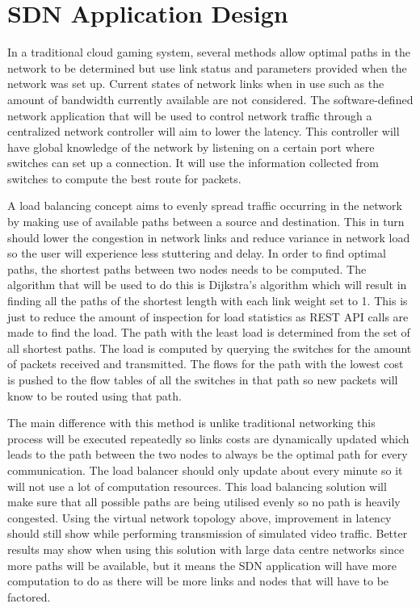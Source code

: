 \section{SDN Application Design}
In a traditional cloud gaming system, several methods allow optimal paths in the network to be determined but use link status and parameters provided when the network was set up. Current states of network links when in use such as the amount of bandwidth currently available are not considered. The software-defined network application that will be used to control network traffic through a centralized network controller will aim to lower the latency. This controller will have global knowledge of the network by listening on a certain port where switches can set up a connection. It will use the information collected from switches to compute the best route for packets.
\newline
\par
A load balancing concept aims to evenly spread traffic occurring in the network by making use of available paths between a source and destination. This in turn should lower the congestion in network links and reduce variance in network load so the user will experience less stuttering and delay. In order to find optimal paths, the shortest paths between two nodes needs to be computed. The algorithm that will be used to do this is Dijkstra's algorithm which will result in finding all the paths of the shortest length with each link weight set to 1. This is just to reduce the amount of inspection for load statistics as REST API calls are made to find the load. The path with the least load is determined from the set of all shortest paths. The load is computed by querying the switches for the amount of packets received and transmitted. The flows for the path with the lowest cost is pushed to the flow tables of all the switches in that path so new packets will know to be routed using that path.
\newline
\par
The main difference with this method is unlike traditional networking this process will be executed repeatedly so links costs are dynamically updated which leads to the path between the two nodes to always be the optimal path for every communication. The load balancer should only update about every minute so it will not use a lot of computation resources. This load balancing solution will make sure that all possible paths are being utilised evenly so no path is heavily congested. Using the virtual network topology above, improvement in latency should still show while performing transmission of simulated video traffic. Better results may show when using this solution with large data centre networks since more paths will be available, but it means the SDN application will have more computation to do as there will be more links and nodes that will have to be factored.
